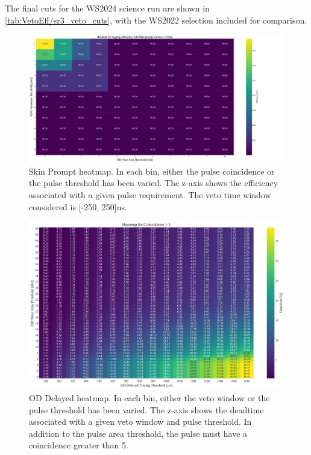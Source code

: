 \noindent
The final cuts for the WS2024 science run are shown in \autoref{tab:VetoEff/sr3_veto_cuts}, with the WS2022 selection included for comparison.

\iffalse
\begin{figure}
	\centering
	\includegraphics[width=\textwidth]{figures/VetoEfficiency/HeatmapSkinPACoinScanWindow500.pdf}
	\caption{Skin Prompt heatmap.
		In each bin, either the pulse coincidence or the pulse threshold has been varied.
		The z-axis shows the efficiency associated with a given pulse requirement.
		The veto time window considered is [-250, 250]ns.}
	\label{fig:VetoEff/skin_prompt_veto_heatmap}
\end{figure}
\begin{figure}
	\centering
	\includegraphics[width=\textwidth]{figures/VetoEfficiency/OD_Deadtime_thesis.png}
	\caption{OD Delayed heatmap.
		In each bin, either the veto window or the pulse threshold has been varied.
		The z-axis shows the deadtime associated with a given veto window and pulse threshold.
		In addition to the pulse area threshold, the pulse must have a coincidence greater than 5.}
	\label{fig:VetoEff/od_delayed_veto_heatmap}
\end{figure}
